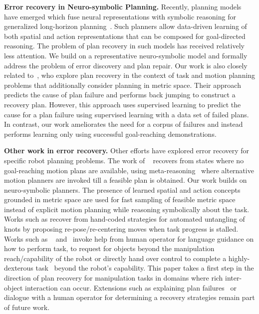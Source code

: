 \textbf{Error recovery in Neuro-symbolic Planning. }
%
Recently, planning models have emerged which fuse neural representations with symbolic reasoning for generalized long-horizon planning~\citep{mao2022pdsketch,Kalithasan2022LearningNP,zhu2021hierarchical,xu2019regression,shridhar2022cliport,Mao2019TheNC}. 
%
Such planners allow data-driven learning of both spatial and action representations that can be composed for goal-directed reasoning. 
%
The problem of plan recovery in such models has received relatively less attention. We build on a representative neuro-symbolic model and formally address the problem of error discovery and plan repair. 
%
Our work is also closely related to~\citep{sung2023learning}, who explore plan recovery in the context of task and motion planning problems that additionally consider planning in metric space. Their approach predicts the cause of plan failure and performs back jumping to construct a recovery plan. However, this approach uses supervised learning to predict the cause for a plan failure using supervised learning with a data set of failed plans. In contrast, our work ameliorates the need for a corpus of failures and instead performs learning only using successful goal-reaching demonstrations. 


\textbf{Other work in error recovery. }
Other efforts have explored error recovery for specific robot planning problems. The work of ~\citep{molnar2023using} recovers from states where no goal-reaching motion plans are available, using meta-reasoning~\citep{griffiths2019doing} where alternative motion planners are invoked till a feasible plan is obtained. Our work builds on neuro-symbolic planners. The presence of learned spatial and action concepts grounded in metric space are used for fast sampling of feasible metric space instead of explicit motion planning while reasoning symbolically about the task. 
%
Works such as \citep{sundaresan2021untangling} recover from hand-coded strategies for automated untangling of knots by proposing re-pose/re-centering moves when task progress is stalled. Works such as ~\citep{sharma2022correcting} and~\citep{knepper2015recovering,li2021reactive} invoke help from human operator for language guidance on how to perform task, to request for objects beyond the manipulation reach/capability of the robot or directly hand over control to complete a highly-dexterous task~\citep{galbally2022elly} beyond the robot's capability. This paper takes a first step in the direction of plan recovery for manipulation tasks in domains where rich inter-object interaction can occur. Extensions such as explaining plan failures~\citep{raman2013towards,raman2014unsynthesizable} or dialogue with a human operator for determining a recovery strategies \cite{banerjee2021robotslang,kim2018learning} remain part of future work.     


